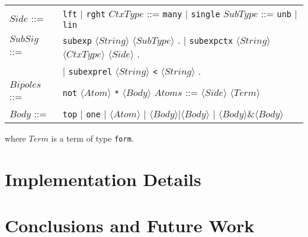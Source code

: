 \documentclass{llncs}
\newcommand{\tup}[1]{\langle#1\rangle}
\begin{document}
\begin{tabular}{ll}
$Side$ ::= & \texttt{lft} $\mid$ \texttt{rght}  \quad $CtxType$ ::=  \texttt{many} $\mid$ \texttt{single} \quad $SubType$ ::=  \texttt{unb} $\mid$ \texttt{lin} \\[2pt]
$SubSig$ ::= & 
{\texttt{subexp} $\tup{String}$ $\tup{SubType}$ .  $\mid$  \texttt{subexpctx} $\tup{String}$ $\tup{CtxType}$ $\tup{Side}$ .}
\\
& {$\mid $ \texttt{subexprel} $\tup{String}$ \texttt{<} $\tup{String}$ .}\\[2pt]
$Bipoles$ ::= & {\texttt{not} $\tup{Atom}$ \texttt{*} $\tup{Body}$}  \quad $Atoms$ ::=  $\tup{Side}$ $\tup{Term}$\\[2pt]
$Body$ ::= & 
{\texttt{top} $\mid$ \texttt{one} $\mid$ $\tup{Atom}$ $\mid$ $\tup{Body} | \tup{Body}$ $\mid$ $\tup{Body} \& \tup{Body}$ }
\end{tabular}

where $Term$ is a term of type \texttt{form}.

\section{Implementation Details}

\section{Conclusions and Future Work}


% 
% 
\end{document}
